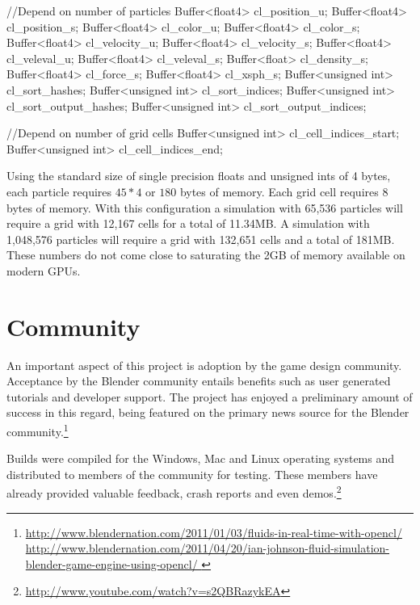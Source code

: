 \begin{cppcode}{0}
        //Depend on number of particles
        Buffer<float4>      cl_position_u;
        Buffer<float4>      cl_position_s;
        Buffer<float4>      cl_color_u;
        Buffer<float4>      cl_color_s;
        Buffer<float4>      cl_velocity_u;
        Buffer<float4>      cl_velocity_s;
        Buffer<float4>      cl_veleval_u;
        Buffer<float4>      cl_veleval_s;
        Buffer<float>       cl_density_s;
        Buffer<float4>      cl_force_s;
        Buffer<float4>      cl_xsph_s;
        Buffer<unsigned int>         cl_sort_hashes;
        Buffer<unsigned int>         cl_sort_indices;
        Buffer<unsigned int>         cl_sort_output_hashes;
        Buffer<unsigned int>         cl_sort_output_indices;

        //Depend on number of grid cells
        Buffer<unsigned int>         cl_cell_indices_start;
        Buffer<unsigned int>         cl_cell_indices_end;
\end{cppcode}

Using the standard size of single precision floats and unsigned ints of 4
bytes, each particle requires $45*4$ or $180$ bytes of memory. Each grid cell
requires $8$ bytes of memory. With this configuration a simulation with 65,536
particles will require a grid with 12,167 cells for a total of 11.34MB. A
simulation with 1,048,576 particles will require a grid with 132,651 cells and a
total of 181MB. These numbers do not come close to saturating the 2GB of memory
available on modern GPUs.


\section{Community}
An important aspect of this project is adoption by the game design community.
Acceptance by the Blender community entails benefits such as user generated
tutorials and developer support. The project has enjoyed a preliminary amount
of success in this regard, being featured on the primary news source for
the Blender community.\footnote{
\url{http://www.blendernation.com/2011/01/03/fluids-in-real-time-with-opencl/}
\\ 
\url{
http://www.blendernation.com/2011/04/20/ian-johnson-fluid-simulation-blender-game-engine-using-opencl/
} }

Builds were compiled for the Windows, Mac and Linux operating systems and
distributed to members of the community for testing. These members have already
provided valuable feedback, crash reports and even demos.\footnote{ \url{http://www.youtube.com/watch?v=s2QBRazykEA}} 

